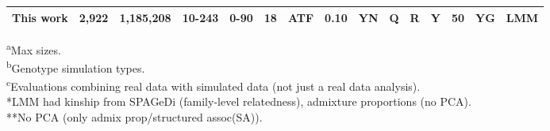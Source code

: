 \documentclass[11pt]{article}
\begin{document}
\begin{table}[hb!]
\begin{tabular}{lrrrrrlrlllllll}
    This work                        & 2,922 &1,185,208 &10-243& 0-90 & 18 & ATF & 0.10 &  YN &  Q &   R &   Y &  50 &  YG & LMM \\
    \bottomrule
  \end{tabular}
  \begin{flushleft} 
    \textsuperscript{a}Max sizes.\\
    \textsuperscript{b}Genotype simulation types.\\
    \textsuperscript{c}Evaluations combining real data with simulated data (not just a real data analysis).\\
    *LMM had kinship from SPAGeDi (family-level relatedness), admixture proportions (no PCA).\\
    **No PCA (only admix prop/structured assoc(SA)).
  \end{flushleft}
\end{table}





\end{document}
